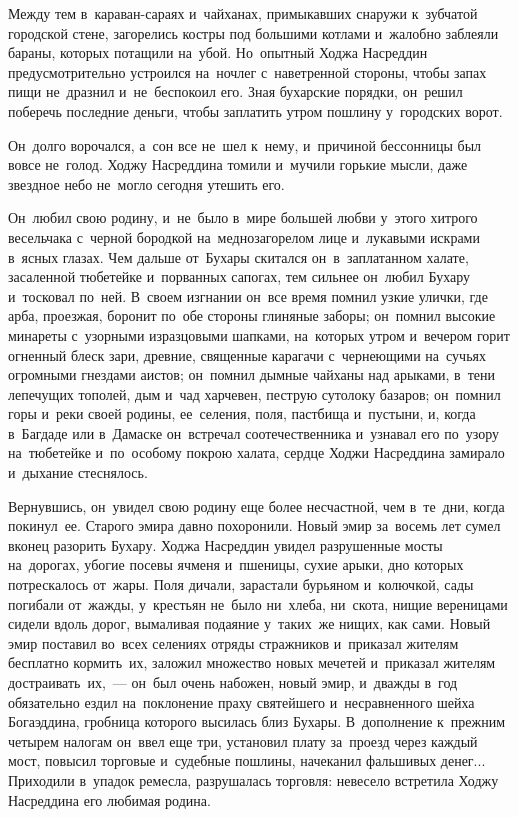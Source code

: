 \documentclass[12pt,a4paper]{book}
\begin{document}
Между тем в~караван-сараях и~чайханах, примыкавших снаружи к~зубчатой городской стене, загорелись костры под большими котлами и~жалобно заблеяли бараны, которых потащили на~убой. Но~опытный Ходжа Насреддин предусмотрительно устроился на~ночлег с~наветренной стороны, чтобы запах пищи не~дразнил и~не~беспокоил его. Зная бухарские порядки, он~решил поберечь последние деньги, чтобы заплатить утром пошлину у~городских ворот.

Он~долго ворочался, а~сон все не~шел к~нему, и~причиной бессонницы был вовсе не~голод. Ходжу Насреддина томили и~мучили горькие мысли, даже звездное небо не~могло сегодня утешить его.

Он~любил свою родину, и~не~было в~мире большей любви у~этого хитрого весельчака с~черной бородкой на~меднозагорелом лице и~лукавыми искрами в~ясных глазах. Чем дальше от~Бухары скитался он~в~заплатанном халате, засаленной тюбетейке и~порванных сапогах, тем сильнее он~любил Бухару и~тосковал по~ней. В~своем изгнании он~все время помнил узкие улички, где арба, проезжая, боронит по~обе стороны глиняные заборы; он~помнил высокие минареты с~узорными изразцовыми шапками, на~которых утром и~вечером горит огненный блеск зари, древние, священные карагачи с~чернеющими на~сучьях огромными гнездами аистов; он~помнил дымные чайханы над арыками, в~тени лепечущих тополей, дым и~чад харчевен, пеструю сутолоку базаров; он~помнил горы и~реки своей родины, ее~селения, поля, пастбища и~пустыни, и, когда в~Багдаде или в~Дамаске он~встречал соотечественника и~узнавал его по~узору на~тюбетейке и~по~особому покрою халата, сердце Ходжи Насреддина замирало и~дыхание стеснялось.

Вернувшись, он~увидел свою родину еще более несчастной, чем в~те~дни, когда покинул~ее. Старого эмира давно похоронили. Новый эмир за~восемь лет сумел вконец разорить Бухару. Ходжа Насреддин увидел разрушенные мосты на~дорогах, убогие посевы ячменя и~пшеницы, сухие арыки, дно которых потрескалось от~жары. Поля дичали, зарастали бурьяном и~колючкой, сады погибали от~жажды, у~крестьян не~было ни~хлеба, ни~скота, нищие вереницами сидели вдоль дорог, вымаливая подаяние у~таких~же нищих, как сами. Новый эмир поставил во~всех селениях отряды стражников и~приказал жителям бесплатно кормить~их, заложил множество новых мечетей и~приказал жителям достраивать~их,~— он~был очень набожен, новый эмир, и~дважды в~год обязательно ездил на~поклонение праху святейшего и~несравненного шейха Богаэддина, гробница которого высилась близ Бухары. В~дополнение к~прежним четырем налогам он~ввел еще три, установил плату за~проезд через каждый мост, повысил торговые и~судебные пошлины, начеканил фальшивых денег... Приходили в~упадок ремесла, разрушалась торговля: невесело встретила Ходжу Насреддина его любимая родина.
\end{document}
